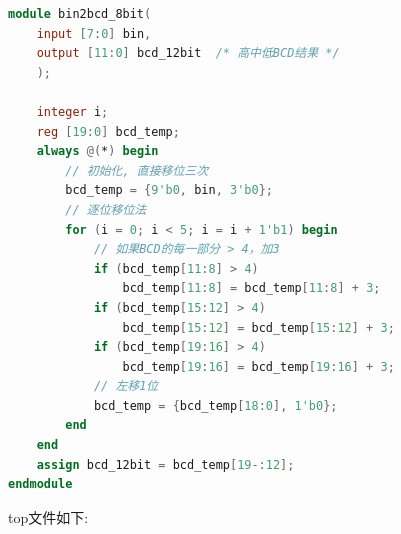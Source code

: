 \documentclass{article}
\begin{document}
\begin{lstlisting}[language=Verilog, caption={二进制转BCD码}]
module bin2bcd_8bit(
    input [7:0] bin, 
    output [11:0] bcd_12bit  /* 高中低BCD结果 */
    );

    integer i;
    reg [19:0] bcd_temp;
    always @(*) begin
        // 初始化, 直接移位三次
        bcd_temp = {9'b0, bin, 3'b0};
        // 逐位移位法
        for (i = 0; i < 5; i = i + 1'b1) begin
            // 如果BCD的每一部分 > 4，加3
            if (bcd_temp[11:8] > 4)
                bcd_temp[11:8] = bcd_temp[11:8] + 3;
            if (bcd_temp[15:12] > 4)
                bcd_temp[15:12] = bcd_temp[15:12] + 3;
            if (bcd_temp[19:16] > 4)
                bcd_temp[19:16] = bcd_temp[19:16] + 3;
            // 左移1位
            bcd_temp = {bcd_temp[18:0], 1'b0};
        end
    end
    assign bcd_12bit = bcd_temp[19-:12];
endmodule
\end{lstlisting}
top文件如下:
\end{document}
